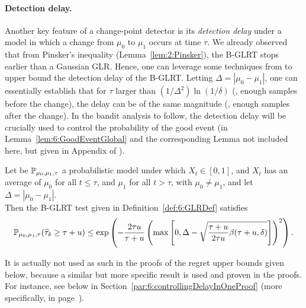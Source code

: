\paragraph{Detection delay.}
%
Another key feature of a change-point detector is its \emph{detection delay} under a model in which a change from $\mu_0$ to $\mu_1$ occurs at time $\tau$. We already observed that from Pinsker's inequality (Lemma~\ref{lem:2:Pinsker}), the B-GLRT stops earlier than a Gaussian GLR. Hence, one can leverage some techniques from \cite{Maillard2018GLR} to upper bound the detection delay of the B-GLRT. Letting $\Delta = |\mu_0 - \mu_1|$, one can essentially establish that for $\tau$ larger than $(1/\Delta^2)\ln(1/\delta)$ (\ie, enough samples before the change), the delay can be of the same magnitude (\ie, enough samples after the change).
In the bandit analysis to follow, the detection delay will be crucially used to control the probability of the good event (in Lemma~\ref{lem:6:GoodEventGlobal} and the corresponding Lemma not included here, but given in Appendix of \cite{Besson2019GLRT}).

\begin{lemma}\label{lem:6:Delay}
\begin{leftbar}[lemmabar]  %
    Let be $\mathbb{P}_{\mu_0,\mu_1,\tau}$ a probabilistic model under which $X_t \in [0,1]$, and $X_t$ has an average of $\mu_0$ for all $t \leq \tau$, and $\mu_1$ for all $t > \tau$, with $\mu_0 \neq \mu_1$,
    and let $\Delta = |\mu_0 - \mu_1|$.\\
    Then the B-GLRT test given in Definition~\ref{def:6:GLRDef} satisfies
    \begin{equation}
        \mathbb{P}_{\mu_0,\mu_1,\tau} (\widehat{\tau}_{\delta} \geq \tau + u) \leq \exp\left( -\frac{2\tau u}{\tau + u}\left(\max\left[ 0, \Delta - \sqrt{\frac{\tau + u}{2\tau u} \beta(\tau + u,\delta)} \right]\right)^2 \right).
    \end{equation}
\end{leftbar}  %
\end{lemma}
%
\begin{smallproof}
    It is actually not used as such in the proofs of the regret upper bounds given below, because a similar but more specific result is used and proven in the proofs.
    For instance, see below in Section~\ref{par:6:controllingDelayInOneProof} (more specifically, in page~\pageref{par:6:controllingDelayInOneProof}).
\end{smallproof}

